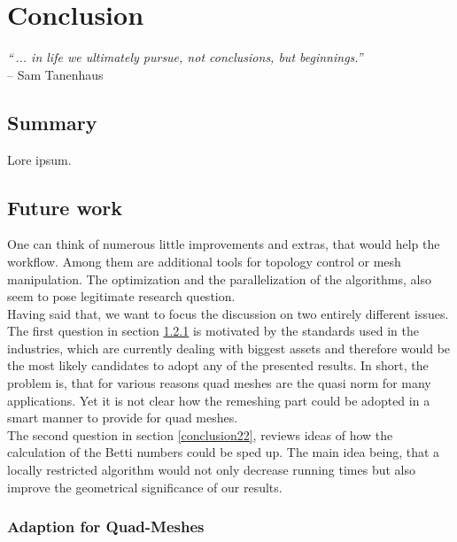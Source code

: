 \chapter{Conclusion}
\label{conclusion0}

\begin{flushright}
\textit{``\,... in life we ultimately pursue, not conclusions, but beginnings.''}\\
-- Sam Tanenhaus \citep[American historian, in:][]{Tanenhaus1986}
\end{flushright}

\section{Summary}
\label{conclusion1}

Lore ipsum.


\section{Future work}
\label{conclusion2}

One can think of numerous little improvements and extras, that would help the workflow.
Among them are additional tools for topology control or mesh manipulation.
The optimization and the parallelization of the algorithms, also seem to pose legitimate research question.\\
Having said that, we want to focus the discussion on two entirely different issues.
The first question in section \ref{conclusion21} is motivated by the standards used in the industries, which are currently dealing with biggest assets and therefore would be the most likely candidates to adopt any of the presented results.
In short, the problem is, that for various reasons quad meshes are the quasi norm for many applications.
Yet it is not clear how the remeshing part could be adopted in a smart manner to provide for quad meshes.\\
The second question in section \ref{conclusion22}, reviews ideas of how the calculation of the Betti numbers could be sped up.
The main idea being, that a locally restricted algorithm would not only decrease running times but also improve the geometrical significance of our results.

\subsection{Adaption for Quad-Meshes}
\label{conclusion21}

